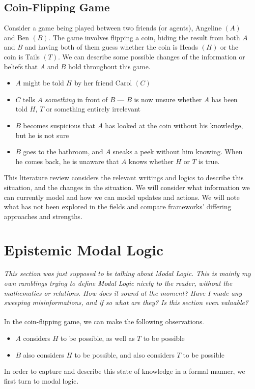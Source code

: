 \documentclass[12pt, a4paper, twoside]{article}
\begin{document}
\subsection{Coin-Flipping Game}\label{intro_coinFlipping}
Consider a game being played between two friends (or agents), Angeline $(A)$
and Ben $(B)$.
The game involves flipping a coin, hiding the result from both $A$ and $B$ and
having both of them guess whether the coin is Heads $(H)$ or the coin is Tails
$(T)$.
We can describe some possible changes of the information or beliefs that $A$ and
$B$ hold throughout this game.
\begin{itemize}
	\item $A$ might be told $H$ by her friend Carol $(C)$
	\item $C$ tells $A$ {\em something} in front of $B$ --- $B$ is now unsure
	whether $A$ has been told $H$, $T$ or something entirely irrelevant 
	\item $B$ becomes suspicious that $A$ has looked at the coin without his
	knowledge, but he is not sure
	\item $B$ goes to the bathroom, and $A$ sneaks a peek without him knowing.
	When he comes back, he is unaware that $A$ knows whether $H$ or $T$ is true.
\end{itemize}
This literature review considers the relevant writings and logics to describe
this situation, and the changes in the situation.
We will consider what information we can currently model and how we can model
updates and actions.
We will note what has not been explored in the fields and compare frameworks'
differing approaches and strengths.

\section{Epistemic Modal Logic}\label{epistemic}
{\em This section was just supposed to be talking about Modal Logic.
This is mainly my own ramblings trying to define Modal Logic nicely to the
reader, without the mathematics or relations.
How does it sound at the moment?
Have I made any sweeping misinformations, and if so what are they?
Is this section even valuable?}\\
\\
In the coin-flipping game, we can make the following observations.
\begin{itemize}
	\item $A$ considers $H$ to be possible, as well as $T$ to be possible
	\item $B$ also considers $H$ to be possible, and also considers $T$ to be possible
\end{itemize}
In order to capture and describe this state of knowledge in a formal manner, we
first turn to modal logic.
\end{document}
